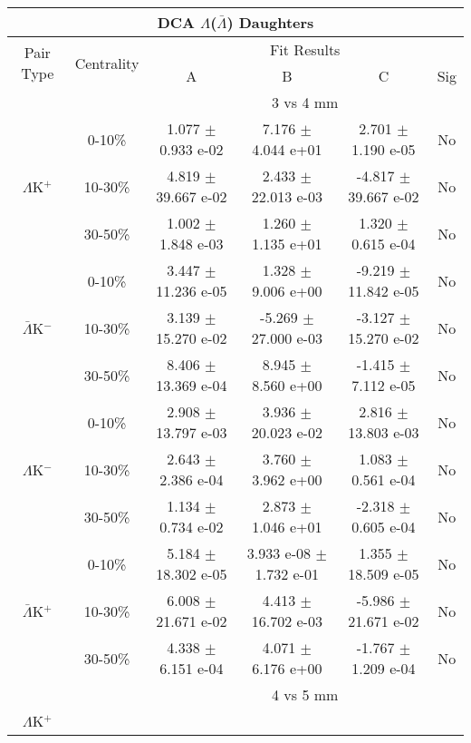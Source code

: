 \documentclass[../AnalysisNoteJBuxton.tex]{subfiles}
\begin{document}
\begin{table}
 \centering
 \begin{tabular}{|c|c|c|c|c|c|}
  \multicolumn{6}{c}{DCA $\Lambda$($\bar{\Lambda}$) Daughters} \\
  \hline
  \multirow{2}{*}{Pair Type} & \multirow{2}{*}{Centrality} & \multicolumn{4}{c|}{Fit Results} \\
  \cline{3-6}
   & & A & B & C & Sig \\  
  \hline
  \multicolumn{2}{|c}{} & \multicolumn{4}{c|}{3 vs 4 mm} \\  
  \hline  
  \multirow{3}{*}{$\Lambda$K$^{+}$}
   &  0-10\% & 1.077 $\pm$ 0.933 e-02 & 7.176 $\pm$ 4.044 e+01 & 2.701 $\pm$ 1.190 e-05 & No \\
   & 10-30\% & 4.819 $\pm$ 39.667 e-02 & 2.433 $\pm$ 22.013 e-03 & -4.817 $\pm$ 39.667 e-02 & No \\
   & 30-50\% & 1.002 $\pm$ 1.848 e-03 & 1.260 $\pm$ 1.135 e+01 & 1.320 $\pm$ 0.615 e-04 & No \\
  \hline
  \multirow{3}{*}{$\bar{\Lambda}$K$^{-}$}  
   &  0-10\% & 3.447 $\pm$ 11.236 e-05 & 1.328 $\pm$ 9.006 e+00 & -9.219 $\pm$ 11.842 e-05 & No \\
   & 10-30\% & 3.139 $\pm$ 15.270 e-02 & -5.269 $\pm$ 27.000 e-03 & -3.127 $\pm$ 15.270 e-02 & No \\
   & 30-50\% & 8.406 $\pm$ 13.369 e-04 & 8.945 $\pm$ 8.560 e+00 & -1.415 $\pm$ 7.112 e-05 & No \\
  \hline \hline
  \multirow{3}{*}{$\Lambda$K$^{-}$}
   &  0-10\% & 2.908 $\pm$ 13.797 e-03 & 3.936 $\pm$ 20.023 e-02 & 2.816 $\pm$ 13.803 e-03 & No \\
   & 10-30\% & 2.643 $\pm$ 2.386 e-04 & 3.760 $\pm$ 3.962 e+00 & 1.083 $\pm$ 0.561 e-04 & No \\
   & 30-50\% & 1.134 $\pm$ 0.734 e-02 & 2.873 $\pm$ 1.046 e+01 & -2.318 $\pm$ 0.605 e-04 & No \\
  \hline
  \multirow{3}{*}{$\bar{\Lambda}$K$^{+}$}  
   &  0-10\% & 5.184 $\pm$ 18.302 e-05 & 3.933 e-08 $\pm$ 1.732 e-01 & 1.355 $\pm$ 18.509 e-05 & No \\
   & 10-30\% & 6.008 $\pm$ 21.671 e-02 & 4.413 $\pm$ 16.702 e-03 & -5.986 $\pm$ 21.671 e-02 & No \\
   & 30-50\% & 4.338 $\pm$ 6.151 e-04 & 4.071 $\pm$ 6.176 e+00 & -1.767 $\pm$ 1.209 e-04 & No \\  
  \hline
  \multicolumn{2}{|c}{} & \multicolumn{4}{c|}{4 vs 5 mm} \\
  \hline  
  \multirow{3}{*}{$\Lambda$K$^{+}$}   

\end{tabular}
\end{table}
\end{document}
